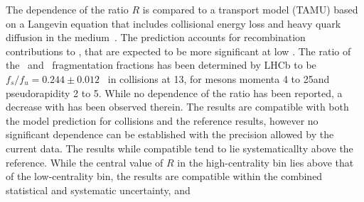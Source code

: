 \documentclass[11pt,twoside,a4paper,cmspaper]{cms-tdr}
\begin{document}
 The \pt dependence of the ratio $R$ is compared to 
 a transport model (TAMU) based on a Langevin equation that includes collisional energy loss and heavy quark diffusion in the medium~\cite{tamu14}.
 The prediction accounts for recombination contributions to \PBzs, that are expected to be more significant at low \pt. 
%
%
The ratio of the \PBzs\ and \PBp\ fragmentation fractions has been determined by LHCb to be  $f_s/f_u =0.244\pm0.012$~\cite{fsfulhcb2019} in  \pp collisions at 13\TeV, for \PB mesons momenta 4 to 25\GeVc and pseudorapidity 2 to 5. While no dependence of the ratio has been reported, a decrease with \pt has been observed therein. 
The results are compatible with both the model prediction for \PbPb collisions and the \pp reference results, however no significant \pt dependence can be established with the precision allowed by the current data. 
%
%
The results %
while compatible tend to lie systematicallty above the \TeV reference. 
While the central value of $R$ in the high-centrality bin lies above that of the low-centrality bin, the results are compatible within the combined statistical and systematic uncertainty, and      
\end{document}
